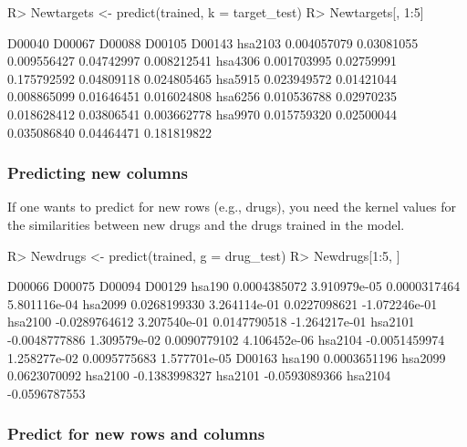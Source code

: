 \documentclass[
]{article}
\begin{document}
\begin{CodeChunk}

\begin{CodeInput}
R> Newtargets <- predict(trained, k = target_test)
R> Newtargets[, 1:5]
\end{CodeInput}

\begin{CodeOutput}
             D00040     D00067      D00088     D00105      D00143
hsa2103 0.004057079 0.03081055 0.009556427 0.04742997 0.008212541
hsa4306 0.001703995 0.02759991 0.175792592 0.04809118 0.024805465
hsa5915 0.023949572 0.01421044 0.008865099 0.01646451 0.016024808
hsa6256 0.010536788 0.02970235 0.018628412 0.03806541 0.003662778
hsa9970 0.015759320 0.02500044 0.035086840 0.04464471 0.181819822
\end{CodeOutput}
\end{CodeChunk}

\hypertarget{predicting-new-columns}{%
\subsubsection{Predicting new columns}\label{predicting-new-columns}}

If one wants to predict for new rows (e.g., drugs), you need the kernel
values for the similarities between new drugs and the drugs trained in
the model.

\begin{CodeChunk}

\begin{CodeInput}
R> Newdrugs <- predict(trained, g = drug_test)
R> Newdrugs[1:5, ]
\end{CodeInput}

\begin{CodeOutput}
               D00066       D00075       D00094        D00129
hsa190   0.0004385072 3.910979e-05 0.0000317464  5.801116e-04
hsa2099  0.0268199330 3.264114e-01 0.0227098621 -1.072246e-01
hsa2100 -0.0289764612 3.207540e-01 0.0147790518 -1.264217e-01
hsa2101 -0.0048777886 1.309579e-02 0.0090779102  4.106452e-06
hsa2104 -0.0051459974 1.258277e-02 0.0095775683  1.577701e-05
               D00163
hsa190   0.0003651196
hsa2099  0.0623070092
hsa2100 -0.1383998327
hsa2101 -0.0593089366
hsa2104 -0.0596787553
\end{CodeOutput}
\end{CodeChunk}

\hypertarget{predict-for-new-rows-and-columns}{%
\subsubsection{Predict for new rows and
columns}\label{predict-for-new-rows-and-columns}}
\end{document}
